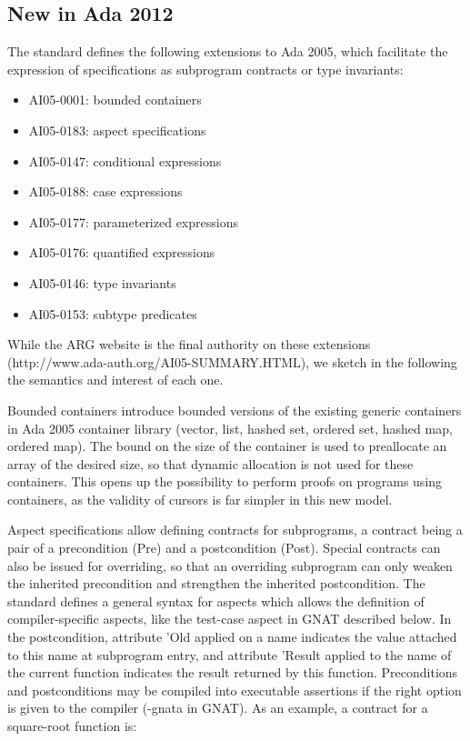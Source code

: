 \documentclass{article}
\begin{document}
\subsection{New in Ada 2012}

The standard defines the following extensions to Ada 2005, which facilitate the
expression of specifications as subprogram contracts or type invariants:

\begin{itemize}
\item AI05-0001: bounded containers
\item AI05-0183: aspect specifications
\item AI05-0147: conditional expressions
\item AI05-0188: case expressions
\item AI05-0177: parameterized expressions
\item AI05-0176: quantified expressions
\item AI05-0146: type invariants
\item AI05-0153: subtype predicates
\end{itemize}

While the ARG website is the final authority on these extensions
(http://www.ada-auth.org/AI05-SUMMARY.HTML), we sketch in the following the
semantics and interest of each one.

Bounded containers introduce bounded versions of the existing generic
containers in Ada 2005 container library (vector, list, hashed set, ordered
set, hashed map, ordered map). The bound on the size of the container is used
to preallocate an array of the desired size, so that dynamic allocation is not
used for these containers. This opens up the possibility to perform proofs on
programs using containers, as the validity of cursors is far simpler in this
new model.

Aspect specifications allow defining contracts for subprograms, a contract
being a pair of a precondition (Pre) and a postcondition (Post). Special
contracts can also be issued for overriding, so that an overriding subprogram
can only weaken the inherited precondition and strengthen the inherited
postcondition. The standard defines a general syntax for aspects which allows
the definition of compiler-specific aspects, like the test-case aspect in GNAT
described below. In the postcondition, attribute 'Old applied on a name
indicates the value attached to this name at subprogram entry, and attribute
'Result applied to the name of the current function indicates the result
returned by this function. Preconditions and postconditions may be compiled
into executable assertions if the right option is given to the compiler (-gnata
in GNAT).  As an example, a contract for a square-root function is:
\end{document}

